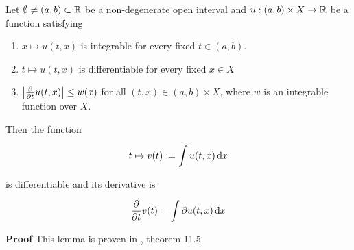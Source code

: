 \begin{lemma}\label{DiffLemma}
 Let $\emptyset \neq (a,b)\subset\mathbb R$ be a non-degenerate open interval and $u:(a,b)\times X\to \mathbb R$ be a function satisfying
\begin{enumerate}
  \item $x\mapsto u(t,x)$ is integrable for every fixed $t\in(a,b)$.
  \item $t\mapsto u(t,x)$ is differentiable for every fixed $x\in X$
  \item $\left| {\frac{\partial}{\partial t} u(t,x)} \right|\leq w(x)$ for all $(t,x)\in (a,b)\times X$, where $w$ is an integrable function over $X$.
\end{enumerate}

Then the function 

\begin{equation}
  t\mapsto v(t):=\int u(t,x) \,{\rm d} x
\end{equation}

is differentiable and its derivative is

\begin{equation}
  \frac{\partial}{\partial t} v(t) = \int \partial u(t,x) \,{\rm d} x
\end{equation}
\end{lemma}
\textbf{Proof} This lemma is proven in \cite[p.~92]{schilling.11}, theorem 11.5.\\

